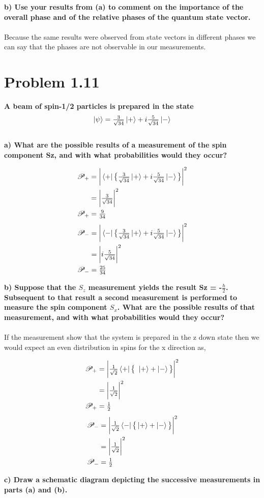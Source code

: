 \documentclass[paper=a4, fontsize=11pt]{scrartcl} %
\numberwithin{equation}{section} %
\numberwithin{figure}{section} %
\numberwithin{table}{section} %
\begin{document}
\textbf{b) Use your results from (a) to comment on the importance of the overall phase and of the
relative phases of the quantum state vector.} \\
\\
Because the same results were observed from state vectors in different phases we can say that the phases are not observable in our measurements.
\section*{Problem 1.11}
\textbf{A beam of spin-1/2 particles is prepared in the state}\\
$$\ket{\psi} = \tfrac{3}{\sqrt{34}} \ket{+} + i\tfrac{5}{\sqrt{34}} \ket{-}$$ 
\\
\textbf{a) What are the possible results of a measurement of the spin component Sz, and with what
probabilities would they occur?} \\
\begin{multicols}{2}
\noindent
\begin{align*}
\mathscr{P}_+ & = \bigg | \bra{+} \big \{  \tfrac{3}{\sqrt{34}} \ket{+} + i\tfrac{5}{\sqrt{34}} \ket{-} \big \} \bigg|^2 \\
& = \bigg | \tfrac{3}{\sqrt{34}} \bigg|^2 \\
\mathscr{P}_+ & = \tfrac{9}{34}
\end{align*}
\begin{align*}
\mathscr{P}_- & = \bigg | \bra{-} \big \{  \tfrac{3}{\sqrt{34}} \ket{+} + i\tfrac{5}{\sqrt{34}} \ket{-} \big \} \bigg|^2 \\
& = \bigg | i\tfrac{5}{\sqrt{34}} \bigg|^2 \\
\mathscr{P}_- & = \tfrac{25}{34}
\end{align*}
\end{multicols}
\textbf{b) Suppose that the $S_z$ measurement yields the result Sz = -$\frac{\hbar}{2}$. Subsequent to that result a second measurement is performed to measure the spin component $S_x$. What are the
possible results of that measurement, and with what probabilities would they occur?}\\
\\
If the measurement show that the system is prepared in the z down state then we would expect an even distribution in spins for the x direction as,
\begin{multicols}{2}
\noindent
\begin{align*}
\mathscr{P}_+ & = \bigg | \tfrac{1}{\sqrt{2}}\bra{+}  \big \{  \  \ket{+} + \ket{-} \big \} \bigg|^2 \\
& = \bigg | \tfrac{1}{\sqrt{2}} \bigg|^2 \\
\mathscr{P}_+ & = \tfrac{1}{2}
\end{align*}
\begin{align*}
\mathscr{P}_- & = \bigg | \tfrac{1}{\sqrt{2}}\bra{-} \big \{  \ket{+} + \ket{-} \big \} \bigg|^2 \\
& = \bigg | \tfrac{1}{\sqrt{2}} \bigg|^2 \\
\mathscr{P}_- & = \tfrac{1}{2}
\end{align*}
\end{multicols}
\textbf{c) Draw a schematic diagram depicting the successive measurements in parts (a) and (b).}\\
\\

\end{document}
